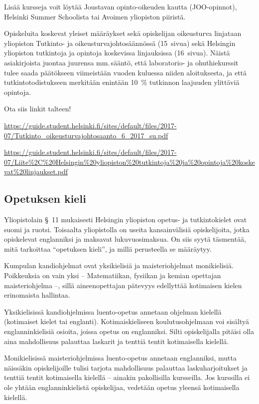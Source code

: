 \documentclass[a5paper, 8pt, twocolumn]{book} %
\numberwithin{equation}{section}
\begin{document}
Lisää kursseja voit löytää Joustavan opinto-oikeuden kautta (JOO-opinnot), Helsinki Summer Schoolista tai Avoimen yliopiston piiristä.

Opiskeluita koskevat yleiset määräykset sekä opiskelijan oikeusturva linjataan yliopiston Tutkinto- ja oikeusturvajohtosäännössä (15~sivua) sekä Helsingin yliopiston tutkintoja ja opintoja koskevissa linjauksissa (16~sivua). Näistä asiakirjoista juontaa juurensa mm.\,sääntö, että laboratorio- ja ohuthie\-kurssit tulee saada päätökseen viimeistään vuoden kuluessa niiden aloituksesta, ja että tutkintotodistukseen merkitään enintään 10~\% tutkinnon laajuuden ylittäviä opintoja.

Ota siis linkit talteen!

\url{https://guide.student.helsinki.fi/sites/default/files/2017-07/Tutkinto_oikeusturvajohtosaanto_6_2017_su.pdf}

\url{https://guide.student.helsinki.fi/sites/default/files/2017-07/Liite%2C%20Helsingin%20yliopiston%20tutkintoja%20ja%20opintoja%20koskevat%20linjaukset.pdf}

\subsection*{Opetuksen kieli}
Yliopistolain \S~11 mukaisesti Helsingin yliopiston opetus- ja tutkintokielet ovat suomi ja ruotsi. Toisaalta yliopistolla on useita kansainvälisiä opiskelijoita, jotka opiskelevat englanniksi ja maksavat lukuvuosimaksua. On siis syytä täsmentää, mitä tarkoittaa ``opetuksen kieli'', ja millä perusteella se määräytyy.

Kumpulan kandiohjelmat ovat yksikielisiä ja maisteriohjelmat monikielisiä. Poikkeuksia on vain yksi -- Matematiikan, fysiikan ja kemian opettajan maisteriohjelma --, sillä aineenopettajan pätevyys edellyttää kotimaisen kielen erinomaista hallintaa.

Yksikielisissä kandiohjelmissa luento-opetus annetaan ohjelman kielellä (kotimaiset kielet tai englanti). Kotimaiskieliseen koulutusohjelmaan voi sisältyä englanninkielisiä osioita, joissa opetus on englanniksi. Silti opiskelijalla pitäisi olla aina mahdollisuus palauttaa laskarit ja tenttiä tentit kotimaisella kielellä.

Monikielisissä maisteriohjelmissa luento-opetus annetaan englanniksi, mutta näissäkin opiskelijoille tulisi tarjota mahdollisuus palauttaa laskuharjoitukset ja tenttiä tentit kotimaisella kielellä -- ainakin pakollisilla kursseilla. Jos kurssilla ei ole yhtään englanninkielistä opiskelijaa, vedetään opetus yleensä kotimaisella kielellä.
\end{document}
